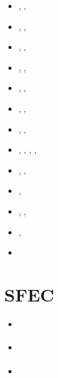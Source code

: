 \begin{small}
\begin{itemize}
                               \textcite{vady10},  \textcite{vayb10}
\item[\twothousandeleven]      \textcite{vahs11},  \textcite{java11},  \textcite{vayj11}
\item[\twothousandtwelve]      \textcite{beva12},  
                               \textcite{chgv12}, \textcite{vakn12}
\item[\twothousandthirteen]    \textcite{ancv13},  \textcite{cibi13},  \textcite{bova13}
\item[\twothousandfourteen]    \textcite{chsg14},  \textcite{mova14},  \textcite{chsv14}
\item[\twothousandfifteen]     \textcite{vasy15},  \textcite{cibi15},  \textcite{mori15}
\item[\twothousandseventeen]   \textcite{civj17},  \textcite{wewv17},  \textcite{mova17}
\item[\twothousandeighteen]    \textcite{spcv18},  \textcite{chss18},  \textcite{mova18}
\item[\twothousandnineteen]    \textcite{zhdv19},  \textcite{vayu19},  \textcite{casv19}, 
                               \textcite{vaws19},  \textcite{cibi19}
\item[\twothousandtwenty]      \textcite{moku20},  \textcite{jomv20},  \textcite{bicc20}
\item[\twothousandtwentyone]   \textcite{pocv21},  \textcite{mota21}
\item[\twothousandtwentythree] \textcite{pocb23},  \textcite{vawi23},  \textcite{vawi23b}
\item[\twothousandtwentyfour]  \textcite{vapc24},  \textcite{mori24}
\item[\twothousandtwentyfive]  \textcite{mori25}
\end{itemize}
\end{small}

\section{SFEC} 


\begin{small}
\begin{itemize}
\item[2008]
\textcite{tosi_thesis}
\item[2020]
\textcite{rers20}
\item[2026]
\textcite{roqv26}
\end{itemize}
\end{small}



